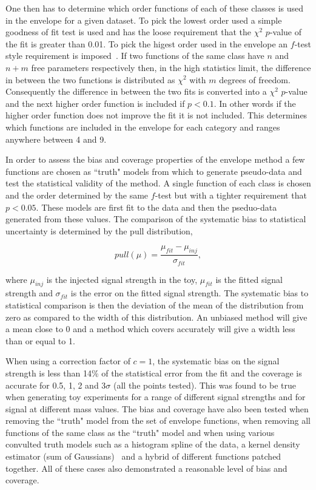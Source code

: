 One then has to determine which order functions of each of these classes is used in the envelope for a given dataset. To pick the lowest order used a simple goodness of fit test is used and has the loose requirement that the $\chi^{2}$ $p$-value of the fit is greater than 0.01. To pick the higest order used in the envelope an $f$-test style requirement is imposed~\cite{ftest}. If two functions of the same class have $n$ and $n+m$ free parameters respectively then, in the high statistics limit, the difference in \NLL between the two functions is distributed as $\chi^{2}$ with $m$ degrees of freedom. Consequently the difference in \NLL between the two fits is converted into a $\chi^{2}$ $p$-value and the next higher order function is included if $p<0.1$. In other words if the higher order function does not improve the fit it is not included. This determines which functions are included in the envelope for each category and ranges anywhere between 4 and 9.

In order to assess the bias and coverage properties of the envelope method a few functions are chosen as ``truth" models from which to generate pseudo-data and test the statistical validity of the method. A single function of each class is chosen and the order determined by the same $f$-test but with a tighter requirement that $p<0.05$. These models are first fit to the data and then the pseduo-data generated from these values. The comparison of the systematic bias to statistical uncertainty is determined by the pull distribution,

\begin{equation}
  pull(\mu) = \frac{\mu_{fit} - \mu_{inj}}{\sigma_{fit}},
\end{equation}

where $\mu_{inj}$ is the injected signal strength in the toy, $\mu_{fit}$ is the fitted signal strength and $\sigma_{fit}$ is the error on the fitted signal strength. The systematic bias to statistical comparison is then the deviation of the mean of the distribution from zero as compared to the width of this distribution. An unbiased method will give a mean close to 0 and a method which covers accurately will give a width less than or equal to 1.

When using a correction factor of $c=1$, the systematic bias on the signal strength is less than 14\% of the statistical error from the fit and the coverage is accurate for 0.5, 1, 2 and 3$\sigma$ (all the points tested). This was found to be true when generating toy experiments for a range of different signal strengths and for signal at different mass values. The bias and coverage have also been tested when removing the ``truth" model from the set of envelope functions, when removing all functions of the same class as the ``truth" model and when using various convulted truth models such as a histogram spline of the data, a kernel density estimator (sum of Gaussians)~\cite{kde} and a hybrid of different functions patched together. All of these cases also demonstrated a reasonable level of bias and coverage. 

